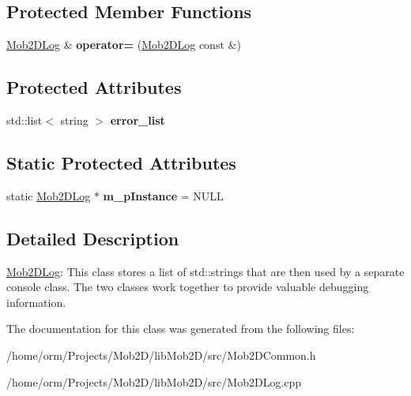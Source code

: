 \subsection*{Protected Member Functions}
\begin{DoxyCompactItemize}
\item 
\hypertarget{classMob2DLog_a5c954bf43c287ba2d86619dcaf026377}{
\hyperlink{classMob2DLog}{Mob2DLog} \& {\bfseries operator=} (\hyperlink{classMob2DLog}{Mob2DLog} const \&)}
\label{classMob2DLog_a5c954bf43c287ba2d86619dcaf026377}

\end{DoxyCompactItemize}
\subsection*{Protected Attributes}
\begin{DoxyCompactItemize}
\item 
\hypertarget{classMob2DLog_a94b239d794897b4d808f3fc443b855ed}{
std::list$<$ string $>$ {\bfseries error\_\-list}}
\label{classMob2DLog_a94b239d794897b4d808f3fc443b855ed}

\end{DoxyCompactItemize}
\subsection*{Static Protected Attributes}
\begin{DoxyCompactItemize}
\item 
\hypertarget{classMob2DLog_afce564c423e6d092e307a3162aa96129}{
static \hyperlink{classMob2DLog}{Mob2DLog} $\ast$ {\bfseries m\_\-pInstance} = NULL}
\label{classMob2DLog_afce564c423e6d092e307a3162aa96129}

\end{DoxyCompactItemize}


\subsection{Detailed Description}
\hyperlink{classMob2DLog}{Mob2DLog}: This class stores a list of std::strings that are then used by a separate console class. The two classes work together to provide valuable debugging information. 

The documentation for this class was generated from the following files:\begin{DoxyCompactItemize}
\item 
/home/orm/Projects/Mob2D/libMob2D/src/Mob2DCommon.h\item 
/home/orm/Projects/Mob2D/libMob2D/src/Mob2DLog.cpp\end{DoxyCompactItemize}
